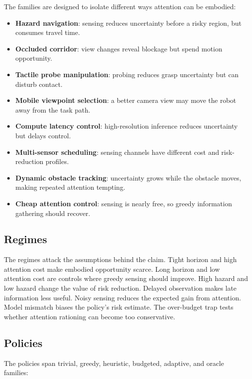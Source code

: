 \documentclass{article}
\begin{document}
The families are designed to isolate different ways attention can be embodied:

\begin{itemize}
    \item \textbf{Hazard navigation}: sensing reduces uncertainty before a
    risky region, but consumes travel time.
    \item \textbf{Occluded corridor}: view changes reveal blockage but spend
    motion opportunity.
    \item \textbf{Tactile probe manipulation}: probing reduces grasp
    uncertainty but can disturb contact.
    \item \textbf{Mobile viewpoint selection}: a better camera view may move
    the robot away from the task path.
    \item \textbf{Compute latency control}: high-resolution inference reduces
    uncertainty but delays control.
    \item \textbf{Multi-sensor scheduling}: sensing channels have different
    cost and risk-reduction profiles.
    \item \textbf{Dynamic obstacle tracking}: uncertainty grows while the
    obstacle moves, making repeated attention tempting.
    \item \textbf{Cheap attention control}: sensing is nearly free, so greedy
    information gathering should recover.
\end{itemize}

\subsection{Regimes}

The regimes attack the assumptions behind the claim. Tight horizon and high
attention cost make embodied opportunity scarce. Long horizon and low
attention cost are controls where greedy sensing should improve. High hazard
and low hazard change the value of risk reduction. Delayed observation makes
late information less useful. Noisy sensing reduces the expected gain from
attention. Model mismatch biases the policy's risk estimate. The
over-budget trap tests whether attention rationing can become too conservative.

\subsection{Policies}

The policies span trivial, greedy, heuristic, budgeted, adaptive, and oracle
families:
\end{document}
